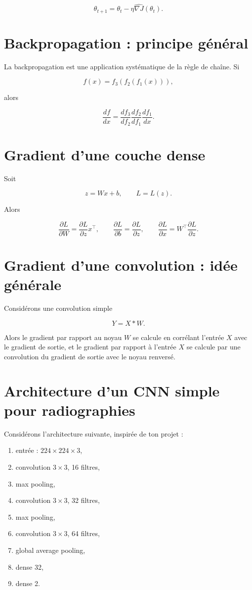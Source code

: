 \documentclass[11pt,a4paper]{article}
\begin{document}
\[
\theta_{t+1} = \theta_t - \eta \widehat{\nabla J}(\theta_t).
\]

\section{Backpropagation : principe général}

La backpropagation est une application systématique de la règle de chaîne. Si

\[
f(x) = f_3(f_2(f_1(x))),
\]

alors

\[
\frac{df}{dx} = \frac{df_3}{df_2}\frac{df_2}{df_1}\frac{df_1}{dx}.
\]

\section{Gradient d'une couche dense}

Soit

\[
z = Wx + b, \qquad L = L(z).
\]

Alors

\[
\frac{\partial L}{\partial W} = \frac{\partial L}{\partial z} x^\top,
\qquad
\frac{\partial L}{\partial b} = \frac{\partial L}{\partial z},
\qquad
\frac{\partial L}{\partial x} = W^\top \frac{\partial L}{\partial z}.
\]

\section{Gradient d'une convolution : idée générale}

Considérons une convolution simple

\[
Y = X \ast W.
\]

Alors le gradient par rapport au noyau $W$ se calcule en corrélant l'entrée $X$ avec le gradient de sortie, et le gradient par rapport à l'entrée $X$ se calcule par une convolution du gradient de sortie avec le noyau renversé.

\section{Architecture d'un CNN simple pour radiographies}

Considérons l'architecture suivante, inspirée de ton projet :
\begin{enumerate}[label=\arabic*)]
    \item entrée : $224 \times 224 \times 3$,
    \item convolution $3\times 3$, 16 filtres,
    \item max pooling,
    \item convolution $3\times 3$, 32 filtres,
    \item max pooling,
    \item convolution $3\times 3$, 64 filtres,
    \item global average pooling,
    \item dense 32,
    \item dense 2.
\end{enumerate}
\end{document}
